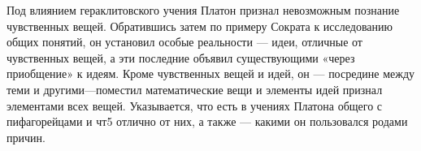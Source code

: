 \documentclass{article}
\begin{document}
Под влиянием гераклитовского учения Платон признал невозможным познание чувственных вещей. Обратившись затем по примеру Сократа к исследованию общих понятий, он установил особые реальности — идеи, отличные от чувственных вещей, а эти последние объявил существующими «через приобщение» к идеям. Кроме чувственных вещей и идей, он — посредине между теми и другими—поместил математические вещи и элементы идей признал элементами всех вещей. Указывается, что есть в учениях Платона общего с пифагорейцами и чт5 отлично от них, а также — какими он пользовался родами причин.
\end{document}

